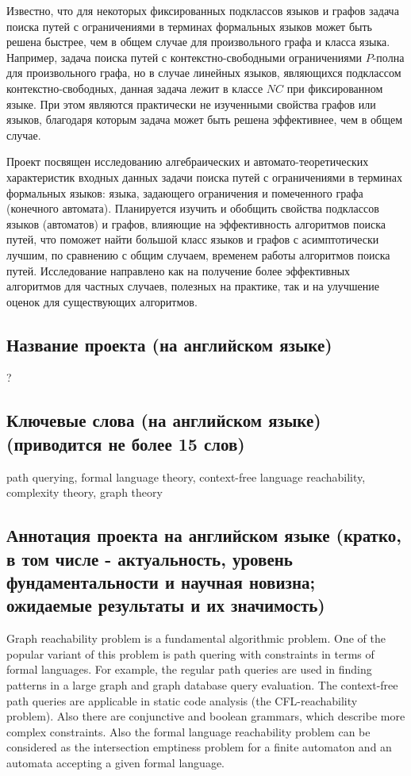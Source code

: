 \documentclass[12pt]{article}  %
\theoremstyle{remark}
\begin{document}
Известно, что для некоторых фиксированных подклассов языков и графов задача поиска путей с ограничениями в терминах формальных языков может быть решена быстрее, чем в общем случае для произвольного графа и класса языка. Например, задача поиска путей с контекстно-свободными ограничениями $P$-полна для произвольного графа, но в случае линейных языков, являющихся подклассом  контекстно-свободных, данная задача лежит в классе $NC$ при фиксированном языке. При этом являются практически не изученными свойства графов или языков, благодаря которым задача может быть решена эффективнее, чем в общем случае. 

Проект посвящен исследованию алгебраических и автомато-теоретических характеристик входных данных задачи поиска путей с ограничениями в терминах формальных языков: языка, задающего ограничения и помеченного графа (конечного автомата).  Планируется изучить и обобщить свойства подклассов языков (автоматов) и графов, влияющие на эффективность алгоритмов поиска путей, что поможет найти большой класс языков и графов с асимптотически лучшим, по сравнению с общим случаем, временем работы алгоритмов поиска путей. Исследование направлено как на получение более эффективных алгоритмов для частных случаев, полезных на практике, так и на улучшение оценок для существующих алгоритмов.


\subsection{Название проекта (на английском языке)}
?

\subsection{Ключевые слова (на английском языке)(приводится не более 15 слов)}
path querying, formal language theory, context-free language reachability, complexity theory, graph theory

\subsection{Аннотация проекта на английском языке (кратко, в том числе - актуальность, уровень фундаментальности и научная новизна; ожидаемые результаты и их значимость)} 
Graph reachability problem  is a fundamental algorithmic problem. One of the popular variant of this problem is path quering with constraints in terms of formal languages. For example, the regular path queries are used in finding patterns in a large graph and graph database query evaluation. The context-free path queries are applicable in static code analysis (the CFL-reachability problem). Also there are conjunctive and boolean grammars, which describe more complex constraints. Also the formal language reachability problem can be considered as the intersection emptiness problem for a finite automaton and an automata accepting a given formal language.
\end{document}
